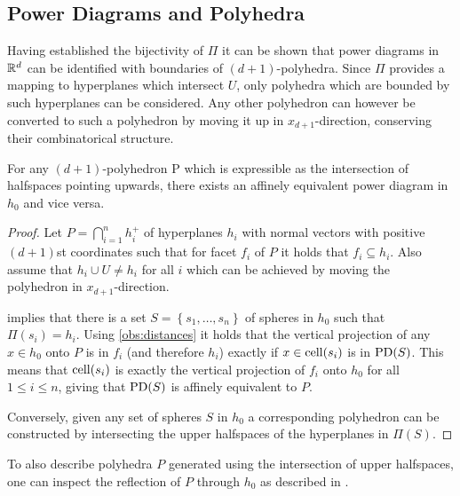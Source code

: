 \subsection{Power Diagrams and Polyhedra}
\label{sub:power_diagrams_and_polyhedra}
Having established the bijectivity of $\Pi$ it can be shown that power diagrams in $\mathbb{R}^d$ can be identified with boundaries of $(d+1)$-polyhedra.
Since $\Pi$ provides a mapping to hyperplanes which intersect $U$, only polyhedra which are bounded by such hyperplanes can be considered.
Any other polyhedron can however be converted to such a polyhedron by moving it up in $x_{d+1}$-direction, conserving their combinatorical structure.
\begin{theorem}
    \label{thm:equivalentpolyhedron}
    For any $(d+1)$-polyhedron P which is expressible as the intersection of halfspaces pointing upwards, there exists an affinely equivalent power diagram in $h_0$ and vice versa.
\end{theorem}
\begin{proof}
    Let $P = \bigcap_{i=1}^n h_i^+$ of hyperplanes $h_i$ with normal vectors with positive $(d+1)$st coordinates such that for facet $f_i$ of $P$ it holds that $f_i \subseteq h_i$.
    Also assume that $h_i \cup U \neq h_i$ for all $i$ which can be achieved by moving the polyhedron in $x_{d+1}$-direction.

     implies that there is a set $S = \left\{ s_1, \dots, s_n \right\}$ of spheres in $h_0$ such that $\Pi(s_i) = h_i$.
    Using \cref{obs:distances} it holds that the vertical projection of any $x \in h_0$ onto $P$ is in $f_i$ (and therefore $h_i$) exactly if $x \in \operatorname{cell}(s_i)$ is in $\operatorname{PD}(S)$.
    This means that $\operatorname{cell}(s_i)$ is exactly the vertical projection of $f_i$ onto $h_0$ for all $1 \leq i \leq n$, giving that $\operatorname{PD}(S)$ is affinely equivalent to $P$.

    Conversely, given any set of spheres $S$ in $h_0$ a corresponding polyhedron can be constructed by intersecting the upper halfspaces of the hyperplanes in $\Pi(S)$.
\end{proof}
To also describe polyhedra $P$ generated using the intersection of upper halfspaces, one can inspect the reflection of $P$ through $h_0$ as described in \cite{aurenhammer1987power}.

